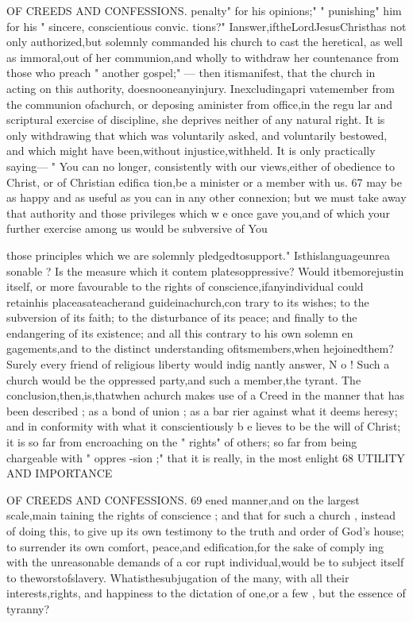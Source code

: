 \documentclass[
]{book}
\begin{document}
OF CREEDS AND CONFESSIONS.
penalty" for his opinions;" " punishing" him for his " sincere, conscientious convic. tions?" Ianswer,iftheLordJesusChristhas not only authorized,but solemnly commanded
his church to cast the heretical, as well as
immoral,out of her communion,and wholly to withdraw her countenance from those who
preach " another gospel;" --- then itismanifest,
that the church in acting on this authority, doesnooneanyinjury. Inexcludingapri vatemember from the communion ofachurch, or deposing aminister from office,in the regu lar and scriptural exercise of discipline, she deprives neither of any natural right. It is
only withdrawing that which was voluntarily asked, and voluntarily bestowed, and which
might have been,without injustice,withheld. It is only practically saying--- " You can no longer, consistently with our views,either of obedience to Christ, or of Christian edifica tion,be a minister or a member with us.
67
may be as happy and as useful as you can in
any other connexion; but we must take away that authority and those privileges which w e once gave you,and of which your further exercise among us would be subversive of
You

those principles which we are solemnly pledgedtosupport." Isthislanguageunrea sonable ? Is the measure which it contem
platesoppressive? Would itbemorejustin itself, or more favourable to the rights of conscience,ifanyindividual could retainhis
placeasateacherand guideinachurch,con trary to its wishes; to the subversion of its
faith; to the disturbance of its peace; and finally to the endangering of its existence; and all this contrary to his own solemn en gagements,and to the distinct understanding
ofitsmembers,when hejoinedthem?Surely every friend of religious liberty would indig nantly answer, N o ! Such a church would be
the oppressed party,and such a member,the tyrant.
The conclusion,then,is,thatwhen achurch makes use of a Creed in the manner that has
been described ; as a bond of union ; as a bar rier against what it deems heresy; and in conformity with what it conscientiously b e lieves to be the will of Christ; it is so far from encroaching on the " rights" of others; so far from being chargeable with " oppres
-sion ;" that it is really, in the most enlight
68 UTILITY AND IMPORTANCE

OF CREEDS AND CONFESSIONS. 69
ened manner,and on the largest scale,main taining the rights of conscience ; and that for
such a church , instead of doing this, to give up its own testimony to the truth and order of
God's house; to surrender its own comfort, peace,and edification,for the sake of comply
ing with the unreasonable demands of a cor rupt individual,would be to subject itself to
theworstofslavery. Whatisthesubjugation
of the many, with all their interests,rights,
and happiness to the dictation of one,or a few , but the essence of tyranny?
\end{document}
